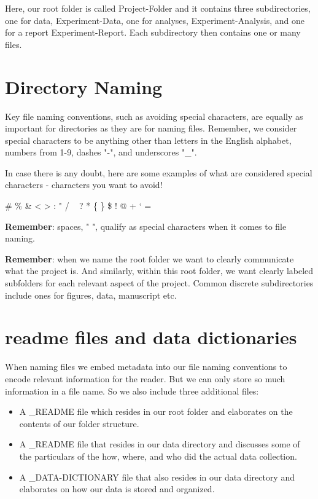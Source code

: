 \documentclass[
]{book}
\providecommand{\tightlist}{%
  \setlength{\itemsep}{0pt}\setlength{\parskip}{0pt}}
\begin{document}
Here, our root folder is called Project-Folder and it contains three subdirectories, one for data, Experiment-Data, one for analyses, Experiment-Analysis, and one for a report Experiment-Report. Each subdirectory then contains one or many files.

\hypertarget{directory-naming}{%
\section{Directory Naming}\label{directory-naming}}

Key file naming conventions, such as avoiding special characters, are equally as important for directories as they are for naming files. Remember, we consider special characters to be anything other than letters in the English alphabet, numbers from 1-9, dashes "-", and underscores "\_".

In case there is any doubt, here are some examples of what are considered special characters - characters you want to avoid!

\# \% \& \textless{} \textgreater{} : " / ~\textbar{} ? * \{ \} \$ ! \textquotesingle{} @ + ` =

\textbf{Remember}: spaces, " ", qualify as special characters when it comes to file naming.

\textbf{Remember}: when we name the root folder we want to clearly communicate what the project is. And similarly, within this root folder, we want clearly labeled subfolders for each relevant aspect of the project. Common discrete subdirectories include ones for figures, data, manuscript etc.

\hypertarget{readme-files-and-data-dictionaries}{%
\section{readme files and data dictionaries}\label{readme-files-and-data-dictionaries}}

When naming files we embed metadata into our file naming conventions to encode relevant information for the reader. But we can only store so much information in a file name. So we also include three additional files:

\begin{itemize}
\tightlist
\item
  A \_README file which resides in our root folder and elaborates on the contents of our folder structure.
\item
  A \_README file that resides in our data directory and discusses some of the particulars of the how, where, and who did the actual data collection.
\item
  A \_DATA-DICTIONARY file that also resides in our data directory and elaborates on how our data is stored and organized.
\end{itemize}
\end{document}
